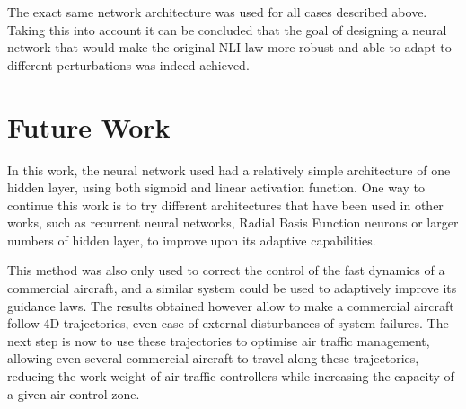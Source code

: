 The exact same network architecture was used for all cases described above. Taking this into account it can be concluded that the goal of designing a neural network that would make the original NLI law more robust and able to adapt to different perturbations was indeed achieved.

\section{Future Work}
\label{section:future}

In this work, the neural network used had a relatively simple architecture of one hidden layer, using both sigmoid and linear activation function. One way to continue this work is to try different architectures that have been used in other works, such as recurrent neural networks, Radial Basis Function neurons or larger numbers of hidden layer, to improve upon its adaptive capabilities. 

This method was also only used to correct the control of the fast dynamics of a commercial aircraft, and a similar system could be used to adaptively improve its guidance laws. The results obtained however allow to make a commercial aircraft follow 4D trajectories, even case of external disturbances of system failures. The next step is now to use these trajectories to optimise air traffic management, allowing even several commercial aircraft to travel along these trajectories, reducing the work weight of air traffic controllers while increasing the capacity of a given air control zone.

